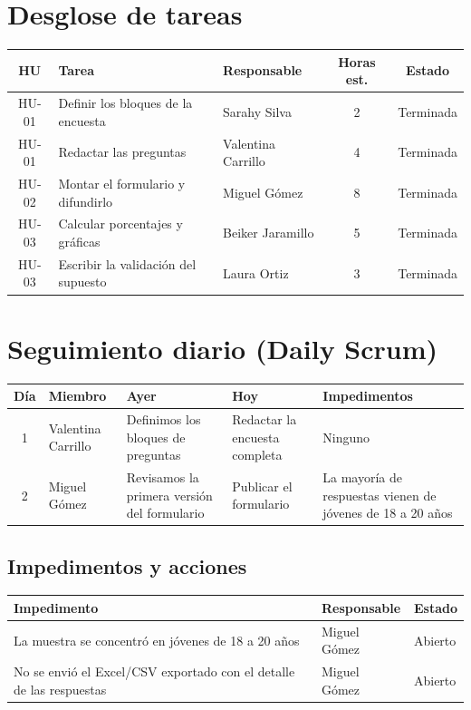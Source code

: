 \documentclass[11pt,a4paper]{article}
\begin{document}
\section{Desglose de tareas}

\begin{tabularx}{\textwidth}{c X l c c}
  \toprule
  \textbf{HU} & \textbf{Tarea} & \textbf{Responsable} & \textbf{Horas est.} & \textbf{Estado} \\
  \midrule
  HU-01 & Definir los bloques de la encuesta & Sarahy Silva & 2 & Terminada \\
  HU-01 & Redactar las preguntas & Valentina Carrillo & 4 & Terminada \\
  HU-02 & Montar el formulario y difundirlo & Miguel Gómez & 8 & Terminada \\
  HU-03 & Calcular porcentajes y gráficas & Beiker Jaramillo & 5 & Terminada \\
  HU-03 & Escribir la validación del supuesto & Laura Ortiz & 3 & Terminada \\
  \bottomrule
\end{tabularx}

\section{Seguimiento diario (Daily Scrum)}

\begin{tabularx}{\textwidth}{c l X X X}
  \toprule
  \textbf{Día} & \textbf{Miembro} & \textbf{Ayer} & \textbf{Hoy} & \textbf{Impedimentos} \\
  \midrule
  1 & Valentina Carrillo & Definimos los bloques de preguntas & Redactar la encuesta completa & Ninguno \\
  2 & Miguel Gómez & Revisamos la primera versión del formulario & Publicar el formulario & La mayoría de respuestas vienen de jóvenes de 18 a 20 años \\
  \bottomrule
\end{tabularx}

\subsection{Impedimentos y acciones}

\begin{tabularx}{\textwidth}{X l l}
  \toprule
  \textbf{Impedimento} & \textbf{Responsable} & \textbf{Estado} \\
  \midrule
  La muestra se concentró en jóvenes de 18 a 20 años & Miguel Gómez & Abierto \\
  No se envió el Excel/CSV exportado con el detalle de las respuestas & Miguel Gómez & Abierto \\
  \bottomrule
\end{tabularx}
\end{document}
